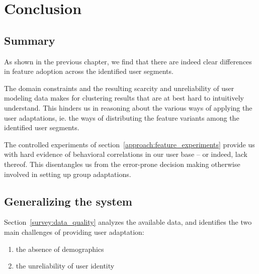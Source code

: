 \chapter{Conclusion}

\label{Chapter5}



\section{Summary} %
\label{conclusion:sec:summary}

As shown in the previous chapter, we find that there are indeed clear differences in feature adoption across the identified user segments.

The domain constraints and the resulting scarcity and unreliability of user modeling data makes for clustering results that are at best hard to intuitively understand. This hinders us in reasoning about the various ways of applying the user adaptations, ie. the ways of distributing the feature variants among the identified user segments.


The controlled experiments of section~\ref{approach:feature_experiments} provide us with hard evidence of behavioral correlations in our user base -- or indeed, lack thereof. This disentangles us from the error-prone decision making otherwise involved in setting up group adaptations.

\section{Generalizing the system} %
\label{conclusion:sec:generalizing_the_system}

Section~\ref{survey:data_quality} analyzes the available data, and identifies the two main challenges of providing user adaptation:

\begin{enumerate}
  \item the absence of demographics
  \item the unreliability of user identity
\end{enumerate}

